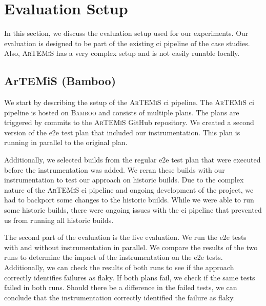 \section{Evaluation Setup}
In this section, we discuss the evaluation setup used for our experiments.
Our evaluation is designed to be part of the existing \ac{ci} pipeline of the case studies.
Also, \textsc{ArTEMiS} has a very complex setup and is not easily runable locally.

\subsection{ArTEMiS (Bamboo)}
We start by describing the setup of the \textsc{ArTEMiS} \ac{ci} pipeline.
The \textsc{ArTEMiS} \ac{ci} pipeline is hosted on \textsc{Bamboo} \autocite{atlassian_bamboo_nodate} and consists of multiple plans.
The plans are triggered by commits to the \textsc{ArTEMiS} GitHub repository.
We created a second version of the \ac{e2e} test plan that included our instrumentation.
This plan is running in parallel to the original plan.

Additionally, we selected builds from the regular \ac{e2e} test plan that were executed before the instrumentation was added.
We reran these builds with our instrumentation to test our approach on historic builds.
Due to the complex nature of the \textsc{ArTEMiS} \ac{ci} pipeline and ongoing development of the project, we had to backport some changes to the historic builds.
While we were able to run some historic builds, there were ongoing issues with the \ac{ci} pipeline that prevented us from running all historic builds.

The second part of the evaluation is the live evaluation.
We run the \ac{e2e} tests with and without instrumentation in parallel.
We compare the results of the two runs to determine the impact of the instrumentation on the \ac{e2e} tests.
Additionally, we can check the results of both runs to see if the approach correctly identifies failures as flaky.
If both plans fail, we check if the same tests failed in both runs.
Should there be a difference in the failed tests, we can conclude that the instrumentation correctly identified the failure as flaky.

